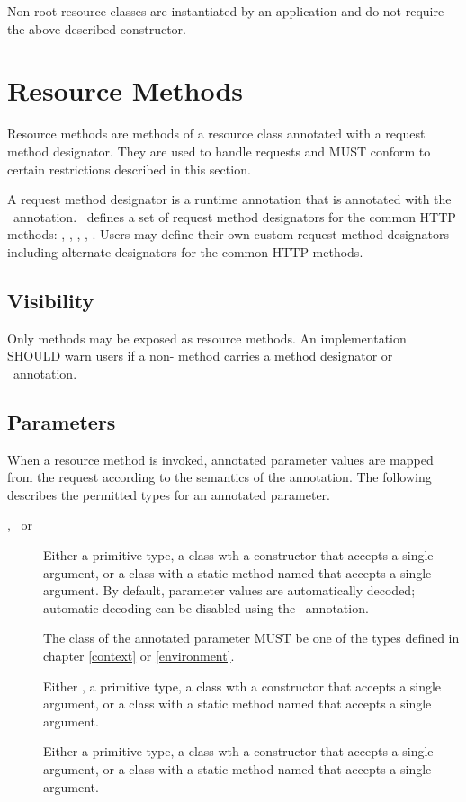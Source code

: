 Non-root resource classes are instantiated by an application and do not require the above-described constructor.

\section{Resource Methods}
\label{resource_method}

Resource methods are methods of a resource class annotated with a request method designator. They are used to handle requests and MUST conform to certain restrictions described in this section.

A request method designator is a runtime annotation that is annotated with the \HttpMethod\ annotation. \jaxrs\ defines a set of request method designators for the common HTTP methods: , , , , . Users may define their own custom request method designators including alternate designators for the common HTTP methods.

\subsection{Visibility}

Only  methods may be exposed as resource methods. An implementation SHOULD warn users if a non- method carries a method designator or \Path\ annotation.

\subsection{Parameters}
\label{resource_method_params}

When a resource method is invoked, annotated parameter values are mapped from the request according to the semantics of the annotation. The following describes the permitted types for an annotated parameter.
\begin{description}
\item[\MatrixParam, \QueryParam\ or \PathParam] Either a primitive type, a class wth a constructor that accepts a single  argument, or a class with a static method named  that accepts a single  argument. By default, parameter values are automatically decoded; automatic decoding can be disabled using the \Encoded\ annotation.
\item[\Context] The class of the annotated parameter MUST be one of the types defined in chapter \ref{context} or \ref{environment}.
\item[\CookieParam] Either , a primitive type, a class wth a constructor that accepts a single  argument, or a class with a static method named  that accepts a single  argument.
\item[\HeaderParam] Either a primitive type, a class wth a constructor that accepts a single  argument, or a class with a static method named  that accepts a single  argument.
\end{description}

